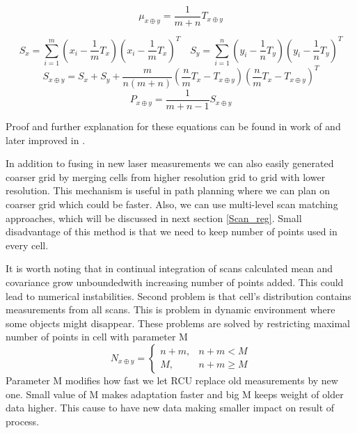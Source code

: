 \begin{equation}
\label{NDT_mean_RCU}
\mu_{x\oplus y} =\dfrac{1}{m + n}T_{x\oplus y}
\end{equation} 

\begin{equation}
S_{x} = \sum_{i=1}^{m}(x_{i} - \frac{1}{m}T_{x})(x_{i} - \frac{1}{m}T_{x})^{T} \quad 
S_{y} = \sum_{i=1}^{n}(y_{i} - \frac{1}{n}T_{y})(y_{i} - \frac{1}{n}T_{y})^{T}
\end{equation}
\begin{equation}
S_{x\oplus y} = S_{x} + S_{y} + \dfrac{m}{n(m+n)}(\frac{n}{m}T_{x} - T_{x\oplus y})(\frac{n}{m}T_{x} - T_{x\oplus y})^{T}
\end{equation}
\begin{equation}
\label{NDT_covar_RCU}
P_{x\oplus y} = \dfrac{1}{m+n -1}S_{x\oplus y}
\end{equation}

Proof and further explanation for these equations can be found in work of \cite{Saarinen13} and later improved in \cite{Saarinen213}.

In addition to fusing in new laser measurements we can also easily generated coarser grid by merging cells from higher resolution grid to grid with lower resolution. This mechanism is useful in path planning where we can plan on coarser grid which could be faster. Also, we can use multi-level scan matching approaches, which will be discussed in next section \ref{Scan_reg}. Small disadvantage of this method is that we need to keep number of points used in every cell.

It is worth noting that in continual integration of scans calculated mean and covariance grow unboundedwith increasing number of points added. This could lead to numerical instabilities. Second problem is that cell's distribution contains measurements from all scans. This is problem in dynamic environment where some objects might disappear. These problems are solved by restricting maximal number of points in cell with parameter M
\begin{equation}
N_{x \oplus y} = 
\begin{cases}
n+m, & n+m < M \\
M, & n+m \geq M
\end{cases} 
\end{equation}
Parameter M modifies how fast we let RCU replace old measurements by new one. Small value of M makes adaptation faster and big M keeps weight of older data higher. This cause to have new data making smaller impact on result of process. 

